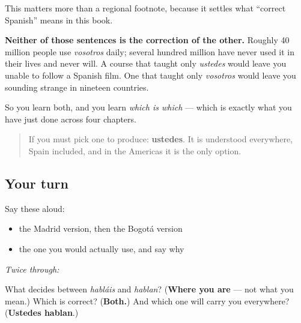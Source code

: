 \begin{grammarlens}[title={What you've built}]
This matters more than a regional footnote, because it settles what \textquotedblleft{}correct Spanish\textquotedblright{} means in this book.

\textbf{Neither of those sentences is the correction of the other.} Roughly 40 million people use \emph{vosotros} daily; several hundred million have never used it in their lives and never will. A course that taught only \emph{ustedes} would leave you unable to follow a Spanish film. One that taught only \emph{vosotros} would leave you sounding strange in nineteen countries.

So you learn both, and you learn \emph{which is which} — which is exactly what you have just done across four chapters.

\begin{quote}
If you must pick one to produce: \textbf{ustedes}. It is understood everywhere, Spain included, and in the Americas it is the only option.
\end{quote}
\end{grammarlens}

\subsection*{Your turn}
Say these aloud:

\begin{itemize}
\raggedright
  \item the Madrid version, then the Bogotá version
  \item the one you would actually use, and say why
\end{itemize}

\emph{Twice through:}

\begin{tcolorbox}[breakable,colback=teal!4,colframe=teal!35!black,title={Before you move on}]
What decides between \emph{habláis} and \emph{hablan}? (\textbf{Where you are} — not what you mean.) Which is correct? (\textbf{Both.}) And which one will carry you everywhere? (\textbf{Ustedes hablan}.)
\end{tcolorbox}
